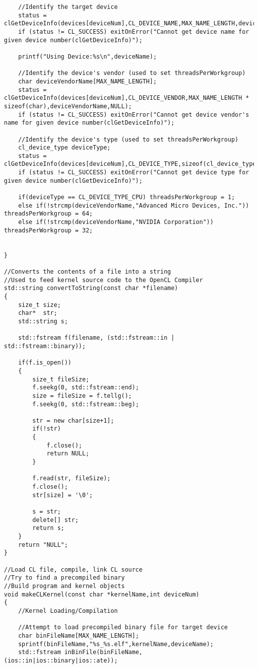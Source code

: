 \begin{verbatim}
	//Identify the target device
	status = clGetDeviceInfo(devices[deviceNum],CL_DEVICE_NAME,MAX_NAME_LENGTH,deviceName,NULL);
	if (status != CL_SUCCESS) exitOnError("Cannot get device name for given device number(clGetDeviceInfo)");
	
	printf("Using Device:%s\n",deviceName);
	
	//Identify the device's vendor (used to set threadsPerWorkgroup)
	char deviceVendorName[MAX_NAME_LENGTH];
	status = clGetDeviceInfo(devices[deviceNum],CL_DEVICE_VENDOR,MAX_NAME_LENGTH * sizeof(char),deviceVendorName,NULL);
	if (status != CL_SUCCESS) exitOnError("Cannot get device vendor's name for given device number(clGetDeviceInfo)");
		
	//Identify the device's type (used to set threadsPerWorkgroup)
	cl_device_type deviceType;
	status = clGetDeviceInfo(devices[deviceNum],CL_DEVICE_TYPE,sizeof(cl_device_type),&deviceType,NULL);
	if (status != CL_SUCCESS) exitOnError("Cannot get device type for given device number(clGetDeviceInfo)");
	
	if(deviceType == CL_DEVICE_TYPE_CPU) threadsPerWorkgroup = 1;
	else if(!strcmp(deviceVendorName,"Advanced Micro Devices, Inc.")) threadsPerWorkgroup = 64;
	else if(!strcmp(deviceVendorName,"NVIDIA Corporation")) threadsPerWorkgroup = 32;

 
}

//Converts the contents of a file into a string
//Used to feed kernel source code to the OpenCL Compiler
std::string convertToString(const char *filename)
{
	size_t size;
	char*  str;
	std::string s;

	std::fstream f(filename, (std::fstream::in | std::fstream::binary));

	if(f.is_open())
	{
		size_t fileSize;
		f.seekg(0, std::fstream::end);
		size = fileSize = f.tellg();
		f.seekg(0, std::fstream::beg);

		str = new char[size+1];
		if(!str)
		{
			f.close();
			return NULL;
		}

		f.read(str, fileSize);
		f.close();
		str[size] = '\0';

		s = str;
		delete[] str;
		return s;
	}
	return "NULL";
}

//Load CL file, compile, link CL source
//Try to find a precompiled binary
//Build program and kernel objects	
void makeCLKernel(const char *kernelName,int deviceNum)
{
	//Kernel Loading/Compilation		
	
	//Attempt to load precompiled binary file for target device
	char binFileName[MAX_NAME_LENGTH];
	sprintf(binFileName,"%s_%s.elf",kernelName,deviceName);
	std::fstream inBinFile(binFileName, (ios::in|ios::binary|ios::ate));
	

\end{verbatim}
